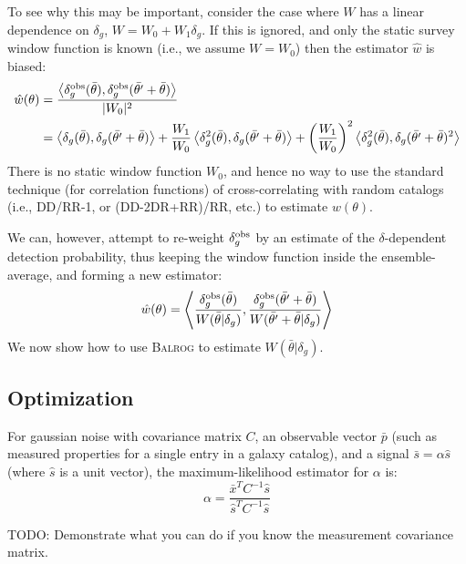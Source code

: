 \documentclass[11pt]{book}
\newcommand{\balrog}{\textsc{Balrog}}
\begin{document}
To see why this may be important, consider the case where $W$ has a
linear dependence on $\delta_g$, $W = W_0 + W_1 \delta_g$. If this is
ignored, and only the static survey window function is known (i.e., we
assume $W = W_0$) then the estimator $\hat{w}$ is biased:
\begin{align}
\hat{w}(\theta) &= \frac{\left<\delta_g^{\rm obs}(\bar{\theta}),
    \delta_g^{\rm obs}(\bar{\theta'}+\bar{\theta})\right>}{|W_0|^2} \\
&=
\left<\delta_g(\bar{\theta}),\delta_g(\bar{\theta'}+\bar{\theta})\right>
+ \frac{W_1}{W_0}\left<\delta_g^2(\bar{\theta}),
  \delta_g(\bar{\theta'}+\bar{\theta})\right> + \left(\frac{W_1}{W_0}\right)^2\left<\delta_g^2(\bar{\theta}),\delta_g(\bar{\theta'}+\bar{\theta})^2\right>
\end{align}
There is no static window function $W_0$, and hence no way to use the
standard technique (for correlation functions) of cross-correlating
with random catalogs (i.e., DD/RR-1, or (DD-2DR+RR)/RR, etc.) to
estimate $w(\theta)$.

We can, however, attempt to re-weight $\delta_g^{\rm obs}$ by an estimate of the
$\delta$-dependent detection probability, thus keeping the window
function inside the ensemble-average, and forming a new estimator:
\begin{equation}
\hat{w}(\theta) = \left<\frac{\delta_g^{\rm obs}(\bar{\theta})}{W(\bar{\theta}|\delta_g)},\frac{\delta_g^{\rm obs}(\bar{\theta'}+\bar{\theta})}{W(\bar{\theta'}+\bar{\theta}|\delta_g)}\right>
\end{equation}
We now show how to use \balrog{} to estimate $W(\bar{\theta}|\delta_g)$.


\subsection{Optimization}
For gaussian noise with covariance matrix $C$, an observable vector
$\bar{p}$ (such as measured properties for a single entry in a galaxy
catalog), and a signal $\bar{s} = \alpha\hat{s}$ (where $\hat{s}$ is a
unit vector), the maximum-likelihood estimator for $\alpha$ is:
\begin{equation}
\alpha = \frac{\bar{x}^T C^{-1} \hat{s}}{\hat{s}^T C^{-1} \hat{s}}
\end{equation}

TODO: Demonstrate what you can do if you know the measurement
covariance matrix.
\end{document}
